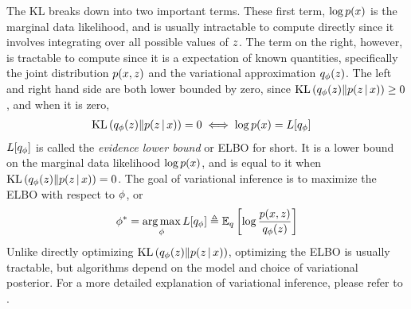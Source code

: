 The KL breaks down into two important terms.
These first term, $\log p(x)$
is the marginal data likelihood,
and is usually intractable to compute directly
since it involves integrating over all possible
values of $z$.
The term on the right, however,
is tractable to compute since 
it is a expectation of known quantities,
specifically the joint distribution $p(x, z)$
and the variational approximation $q_\phi(z)$. 
The left and right hand side are both lower bounded by zero,
since $\mathrm{KL}\left(q_\phi(z)\|p(z \,|\, x)\right) \geq 0$,
and when
it is zero,
\begin{align*}
    \mathrm{KL}\left(q_\phi(z)\|p(z \,|\, x)\right) = 0 \iff \log p(x) &= L[q_\phi]
\end{align*}
$L[q_\phi]$ is called the
\emph{evidence lower bound} or ELBO for short.
It is a lower bound on the marginal data
likelihood $\log p(x)$, and is equal 
to it when $\mathrm{KL}\left(q_\phi(z)\|p(z \,|\, x)\right) = 0$.
The goal of variational inference is to maximize the ELBO with respect to $\phi$, or
\begin{align*}
\phi^* = \operatorname*{arg\,max}_\phi L[q_\phi] \triangleq \mathbb{E}_q\left[\log \frac{p(x, z)}{q_\phi(z)}\right] 
\end{align*}
Unlike directly optimizing $\mathrm{KL}\left(q_\phi(z)\|p(z \,|\, x)\right)$, optimizing the ELBO is usually tractable, but algorithms
depend on the model and choice of variational posterior.
For a more detailed explanation of variational inference,
please refer to \citet{Blei2017}.

